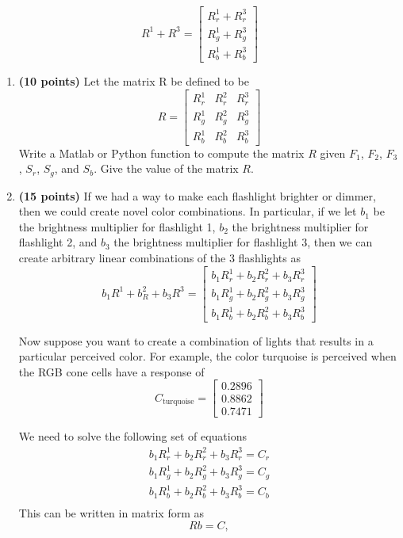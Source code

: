 \documentclass[10pt,letterpaper]{article}
\begin{document}
\[
	R^1 + R^3 = \left[ \begin{array}{c}
				R^1_r + R^3_r\\
				R^1_g + R^3_g\\				
				R^1_b + R^3_b\end{array} \right]
\]

\begin{enumerate}
\item \textbf{(10 points)} Let the matrix R be defined to be 
\[
	R = \left[ \begin{array}{ccc}
				R^1_r &  R^2_r & R^3_r\\
				R^1_g &  R^2_g & R^3_g\\
				R^1_b &  R^2_b & R^3_b\end{array} \right]
\]
Write a Matlab or Python function to compute the matrix $R$ given $F_1$, $F_2$, $F_3$, $S_r$, $S_g$, and $S_b$. Give the value of the matrix $R$.


\item \textbf{(15 points)} If we had a way to make each flashlight brighter or dimmer, then we could
create novel color combinations. In particular, if we let $b_1$ be the brightness
multiplier for flashlight 1, $b_2$ the brightness multiplier for flashlight 2, and $b_3$ the brightness multiplier for flashlight 3, then we can create arbitrary linear
combinations of the 3 flashlights as
\[
	b_1R^1 + b_R^2 + b_3R^3 = \left[ \begin{array}{c}
				b_1R^1_r + b_2R^2_r + b_3R^3_r\\
				b_1R^1_g + b_2R^2_g + b_3R^3_g\\				
				b_1R^1_b + b_2R^2_b + b_3R^3_b\end{array} \right]
\]

Now suppose you want to create a combination of lights that results in a
particular perceived color. For example, the color turquoise is perceived when
the RGB cone cells have a response of
\[
C_{\text{turquoise}} = \left[ \begin{array}{c} 0.2896 \\ 0.8862 \\ 0.7471 \end{array} \right]
\]

We need to solve the following set of equations
\begin{eqnarray*}
b_1R^1_r + b_2R^2_r + b_3R^3_r = C_r\\
b_1R^1_g + b_2R^2_g + b_3R^3_g = C_g \\
b_1R^1_b + b_2R^2_b + b_3R^3_b = C_b \\
\end{eqnarray*}
This can be written in matrix form as
\[ Rb = C, \]


\end{enumerate}
\end{document}
